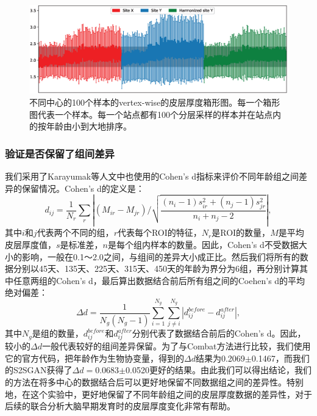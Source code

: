 \begin{figure}[t]
\centering
\includegraphics[width=\textwidth]{figure/s2sgan_boxplot.eps}
\caption{不同中心的100个样本的vertex-wise的皮层厚度箱形图。每一个箱形图代表一个样本。每一个站点都有100个分层采样的样本并在站点内的按年龄由小到大地排序。}\label{fig:s2sgan_boxplot} 
\end{figure} 

\subsubsection{验证是否保留了组间差异}
我们采用了Karayumak等人\cite{karayumak2019retrospective}文中也使用的Cohen's d指标来评价不同年龄组之间差异的保留情况。Cohen's d的定义是：
\begin{equation}
 {d_{ij}} = \frac{1}{{{N_r}}}\sum\limits_r {\left| {({M_{ir}} - {M_{jr}})/\sqrt {\frac{{({n_i} - 1)s_{ir}^2 + ({n_j} - 1)s_{jr}^2}}{{{n_i} + {n_j} - 2}}} } \right|},
\end{equation}
其中$i$和$j$代表两个不同的组，$r$代表每个ROI的特征，$N_r$是ROI的数量，$M$是平均皮层厚度值，$s$是标准差，$n$是每个组内样本的数量。因此，Cohen's d不受数据大小的影响，一般在0.1～2.0之间，与组间的差异大小成正比。然后我们将所有的数据分别以45天、135天、225天、315天、450天的年龄为界分为6组，再分别计算其中任意两组的Cohen's d，最后算出数据结合前后所有组之间的Coehen's d的平均绝对偏差：
\begin{equation}
     \Delta d = \frac{1}{{{N_g}({N_g} - 1)}}\sum\limits_{i = 1}^{{N_g}} {\sum\limits_{j \ne i}^{{N_g}} {\left| {d_{ij}^{before} - d_{ij}^{after}} \right|} },
\end{equation}
其中$N_g$是组的数量，$d_{ij}^{before}$和$d_{ij}^{after}$分别代表了数据结合前后的Cohen's d。因此，较小的$\Delta d$一般代表较好的组间差异保留。为了与Combat方法进行比较，我们使用它的官方代码，把年龄作为生物协变量，得到的$\Delta d$结果为0.2069$\pm$0.1467，而我们的S2SGAN获得了$\Delta d=$0.0683$\pm$0.0520更好的结果。由此我们可以得出结论，我们的方法在将多中心的数据结合后可以更好地保留不同数据组之间的差异性。特别地，在这个实验中，更好地保留了不同年龄组之间的皮层厚度数据的差异性，对于后续的联合分析大脑早期发育时的皮层厚度变化非常有帮助。

